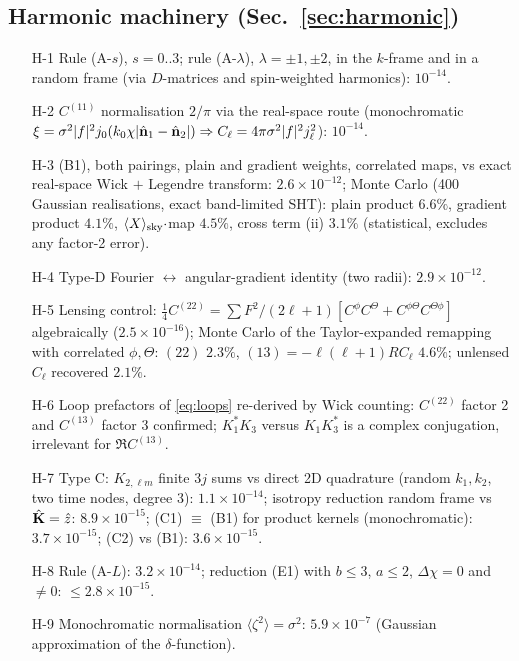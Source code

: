 \subsection*{Harmonic machinery (Sec.~\ref{sec:harmonic})}
\begin{itemize}\itemsep1pt
\item[H-1] Rule (A-$s$), $s=0..3$; rule (A-$\lambda$), $\lambda=\pm1,\pm2$, in the $k$-frame and in a random frame (via $D$-matrices and spin-weighted harmonics): $10^{-14}$.
\item[H-2] $C^{(11)}$ normalisation $2/\pi$ via the real-space route (monochromatic $\xi=\sigma^2|f|^2j_0(k_0\chi|\hat{\mathbf n}_1-\hat{\mathbf n}_2|)\Rightarrow C_\ell=4\pi\sigma^2|f|^2j_\ell^2$): $10^{-14}$.
\item[H-3] (B1), both pairings, plain and gradient weights, correlated maps, vs exact real-space Wick $+$ Legendre transform: $2.6\times10^{-12}$; Monte Carlo (400 Gaussian realisations, exact band-limited SHT): plain product $6.6\%$, gradient product $4.1\%$, $\langle X\rangle_{\rm sky}\cdot$map $4.5\%$, cross term (ii) $3.1\%$ (statistical, excludes any factor-2 error).
\item[H-4] Type-D Fourier $\leftrightarrow$ angular-gradient identity (two radii): $2.9\times10^{-12}$.
\item[H-5] Lensing control: $\tfrac14C^{(22)}=\sum F^2/(2\ell+1)[C^\phi C^\Theta+C^{\phi\Theta}C^{\Theta\phi}]$ algebraically ($2.5\times10^{-16}$); Monte Carlo of the Taylor-expanded remapping with correlated $\phi,\Theta$: $(22)$ $2.3\%$, $(13)=-\ell(\ell+1)RC_\ell$ $4.6\%$; unlensed $C_\ell$ recovered $2.1\%$.
\item[H-6] Loop prefactors of \eqref{eq:loops} re-derived by Wick counting: $C^{(22)}$ factor 2 and $C^{(13)}$ factor 3 confirmed; $K^*_1K_3$ versus $K_1K_3^*$ is a complex conjugation, irrelevant for $\Re C^{(13)}$.
\item[H-7] Type C: $K_{2,\ell m}$ finite $3j$ sums vs direct 2D quadrature (random $k_1,k_2$, two time nodes, degree 3): $1.1\times10^{-14}$; isotropy reduction random frame vs $\hat{\mathbf K}=\hat z$: $8.9\times10^{-15}$; (C1) $\equiv$ (B1) for product kernels (monochromatic): $3.7\times10^{-15}$; (C2) vs (B1): $3.6\times10^{-15}$.
\item[H-8] Rule (A-$L$): $3.2\times10^{-14}$; reduction (E1) with $b\le3$, $a\le2$, $\Delta\chi=0$ and $\neq0$: $\le2.8\times10^{-15}$.
\item[H-9] Monochromatic normalisation $\langle\zeta^2\rangle=\sigma^2$: $5.9\times10^{-7}$ (Gaussian approximation of the $\delta$-function).

\end{itemize}

